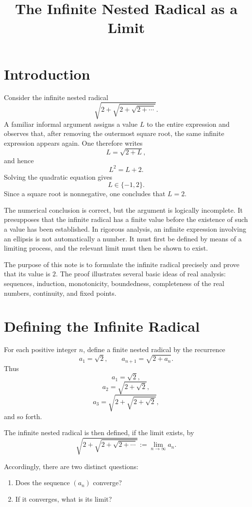 \documentclass{essay}
\title{The Infinite Nested Radical as a Limit}
\author{}
\date{}
\begin{document}
\maketitle

\section{Introduction}

Consider the infinite nested radical
\[
\sqrt{2+\sqrt{2+\sqrt{2+\cdots}}}.
\]
A familiar informal argument assigns a value \(L\) to the entire expression and observes that, after removing the outermost square root, the same infinite expression appears again. One therefore writes
\[
L=\sqrt{2+L},
\]
and hence
\[
L^2=L+2.
\]
Solving the quadratic equation gives
\[
L\in\{-1,2\}.
\]
Since a square root is nonnegative, one concludes that \(L=2\).

The numerical conclusion is correct, but the argument is logically incomplete. It presupposes that the infinite radical has a finite value before the existence of such a value has been established. In rigorous analysis, an infinite expression involving an ellipsis is not automatically a number. It must first be defined by means of a limiting process, and the relevant limit must then be shown to exist.

The purpose of this note is to formulate the infinite radical precisely and prove that its value is \(2\). The proof illustrates several basic ideas of real analysis: sequences, induction, monotonicity, boundedness, completeness of the real numbers, continuity, and fixed points.

\section{Defining the Infinite Radical}

For each positive integer \(n\), define a finite nested radical by the recurrence
\[
a_1=\sqrt{2},
\qquad
a_{n+1}=\sqrt{2+a_n}.
\]
Thus
\[
a_1=\sqrt{2},
\]
\[
a_2=\sqrt{2+\sqrt{2}},
\]
\[
a_3=\sqrt{2+\sqrt{2+\sqrt{2}}},
\]
and so forth.

The infinite nested radical is then defined, if the limit exists, by
\[
\sqrt{2+\sqrt{2+\sqrt{2+\cdots}}}
:=
\lim_{n\to\infty} a_n.
\]

Accordingly, there are two distinct questions:

\begin{enumerate}
    \item Does the sequence \((a_n)\) converge?
    \item If it converges, what is its limit?
\end{enumerate}
\end{document}

